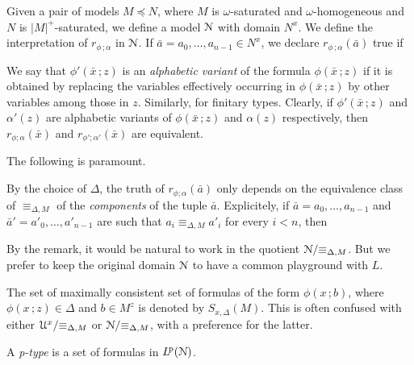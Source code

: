 Given a pair of models $M\preceq N$, where $M$ is $\omega$-saturated and $\omega$-homogeneous and $N$ is $|M|^+$-saturated, we define a model $\EuScript N$ with domain $N^x$.
We define the interpretation of $r_{\phi\,;\alpha}$ in $\EuScript N$.
If $\bar a=a_0,\dots,a_{n-1}\in N^x$, we declare $r_{\phi\,;\alpha}(\bar a)$ true if 



We say that $\phi'(\bar x\,;z)$ is an \emph{alphabetic variant\/} of the formula $\phi(\bar x\,;z)$ if it is obtained by replacing the variables effectively occurring in $\phi(\bar x\,;z)$ by other variables among those in $z$.
Similarly, for finitary types.
Clearly, if $\phi'(\bar x\,;z)$ and $\alpha'(z)$ are alphabetic variants of $\phi(\bar x\,;z)$ and $\alpha(z)$ respectively, then $r_{\phi;\alpha}(\bar x)$ and $r_{\phi';\alpha'}(\bar x)$ are equivalent.

The following is paramount.

\begin{remark}\label{rem_first}
  By the choice of $\Delta$, the truth of $r_{\phi;\alpha}(\bar a)$ only depends on the equivalence class of $\equiv_{\Delta,M}$ of the \textit{components\/} of the tuple $\bar a$.
  Explicitely, if $\bar a=a_0,\dots,a_{n-1}$ and $\bar a'=a'_0,\dots,a'_{n-1}$ are such that $a_i\equiv_{\Delta,M} a'_i$ for every $i<n$, then \smallskip
  
   \smallskip

\end{remark}

By the remark, it would be natural to work in the quotient $\EuScript N/{\equiv_{\Delta,M}}$.
But we prefer to keep the original domain $\EuScript N$ to have a common playground with $L$.

The set of maximally consistent set of formulas of the form $\phi(x\,;b)$, where $\phi(x\,;z)\in\Delta$ and $b\in M^z$ is denoted by  $S_{x,\Delta}(M)$.
This is often confused with either $\EuScript U^x/{\equiv_{\Delta,M}}$ or $\EuScript N/{\equiv_{\Delta,M}}$, with a preference for the latter.

A \emph{p-type\/} is a set of formulas in $L^{\rm\! p}(\EuScript N)$. 


